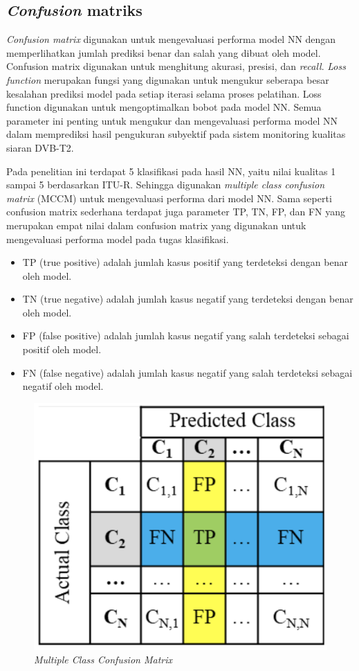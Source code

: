 \subsection{\textit{Confusion} matriks}
\hspace{1.2cm}
\textit{Confusion matrix} digunakan untuk mengevaluasi performa model NN dengan memperlihatkan jumlah prediksi benar dan salah yang dibuat oleh model. Confusion matrix digunakan untuk menghitung akurasi, presisi, dan \textit{recall}. \textit{Loss function} merupakan fungsi yang digunakan untuk mengukur seberapa besar kesalahan prediksi model pada setiap iterasi selama proses pelatihan. Loss function digunakan untuk mengoptimalkan bobot pada model NN. Semua parameter ini penting untuk mengukur dan mengevaluasi performa model NN dalam memprediksi hasil pengukuran subyektif pada sistem monitoring kualitas siaran DVB-T2.

Pada penelitian ini terdapat 5 klasifikasi pada hasil NN, yaitu nilai kualitas 1 sampai 5 berdasarkan ITU-R. Sehingga digunakan \textit{multiple class confusion matrix} (MCCM) untuk mengevaluasi performa dari model NN. Sama seperti confusion matrix sederhana terdapat juga parameter TP, TN, FP, dan FN  yang merupakan empat nilai dalam confusion matrix yang digunakan untuk mengevaluasi performa model pada tugas klasifikasi. 

\begin{itemize}
	\item TP (true positive) adalah jumlah kasus positif yang terdeteksi dengan benar oleh model.
	\item TN (true negative) adalah jumlah kasus negatif yang terdeteksi dengan benar oleh model.
	\item FP (false positive) adalah jumlah kasus negatif yang salah terdeteksi sebagai positif oleh model.
	\item FN (false negative) adalah jumlah kasus negatif yang salah terdeteksi sebagai negatif oleh model.
\end{itemize}

\begin{figure}[H]
	\vspace{-0.1cm}
	\begin{center}
		\includegraphics[width=0.5\columnwidth]{bab3/Gambar/mc-cm.png}
	\end{center}
	\vspace{-0.2cm}
	\caption{\textit{Multiple Class Confusion Matrix} \citep{Markoulidakis_2021}}
	\label{mc-cm}
\end{figure}


